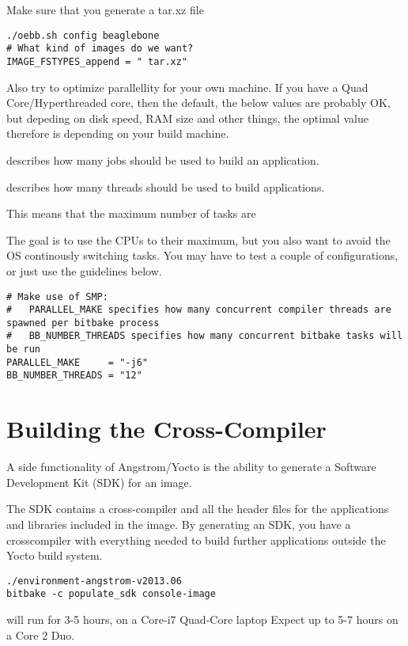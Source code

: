Make sure that you generate a tar.xz file
\begin{verbatim}
./oebb.sh config beaglebone
# What kind of images do we want?
IMAGE_FSTYPES_append = " tar.xz"
\end{verbatim}

Also try to optimize parallellity for your own machine.
If you have a Quad Core/Hyperthreaded core, then the default, 
the below values are probably OK, but depeding on disk speed,
RAM size and other things, the optimal value therefore is depending
on your build machine.

 describes how many  jobs should be used
to build an application. 

 describes how many threads should be used to
build applications. 

This means that the maximum number of tasks are  

The goal is to use the CPUs to their maximum, but you also want
to avoid the OS continously switching tasks. You may have to test a couple
of configurations, or just use the guidelines below.

\begin{verbatim}
# Make use of SMP:
#   PARALLEL_MAKE specifies how many concurrent compiler threads are spawned per bitbake process
#   BB_NUMBER_THREADS specifies how many concurrent bitbake tasks will be run
PARALLEL_MAKE     = "-j6"
BB_NUMBER_THREADS = "12"
\end{verbatim}


\section{Building the Cross-Compiler}

A side functionality of Angstrom/Yocto is the ability to generate
a Software Development Kit (SDK) for an image.

The SDK contains a cross-compiler and all the header files for the applications
and libraries included in the image. By generating an SDK, you have a crosscompiler
with everything needed to build further applications outside the Yocto build system.

\begin{verbatim}
./environment-angstrom-v2013.06
bitbake -c populate_sdk console-image
\end{verbatim}

 will run for 3-5 hours, on a Core-i7 Quad-Core laptop
Expect up to 5-7 hours on a Core 2 Duo.

